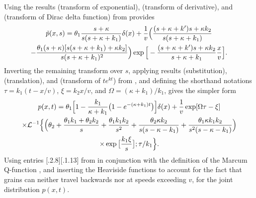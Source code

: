 Using the results \DIFaddbegin [\DIFaddend 15.103\DIFaddbegin ] \DIFaddend (transform of exponential), \DIFaddbegin [\DIFaddend 15.123\DIFaddbegin ] \DIFaddend (transform of derivative), and \DIFaddbegin [\DIFaddend 15.141\DIFaddbegin ] \DIFaddend (transform of Dirac delta function) from \citet{Arfken1985} provides 
\begin{multline} \tilde{p}(x,s) = \theta_1 \frac{s+\kappa}{s(s+\kappa + k_1)}\delta(x) + \frac{1}{v} \Big(\frac{(s+\kappa+k')s+\kappa k_2}{s(s+\kappa+k_1)} \\- \frac{\theta_1(s+\kappa)[s(s+\kappa+k_1)+\kappa k_2]}{s(s+\kappa+k_1)^2}\Big)
	\exp\Big[-\frac{(s+\kappa+k')s+\kappa k_2}{s+\kappa+k_1}\frac{x}{v}\Big].\end{multline}
Inverting the remaining transform over $s$, applying results \DIFaddbegin [\DIFaddend 15.152\DIFaddbegin ] \DIFaddend (substitution), \DIFaddbegin [\DIFaddend 15.164\DIFaddbegin ] \DIFaddend (translation), and \DIFaddbegin [\DIFaddend 15.175\DIFaddbegin ] \DIFaddend (transform of $te^{kt}$) from \citet{Arfken1985}, and defining the shorthand notations $\tau = k_1(t-x/v)$, $\xi = k_2 x/v$, and $\Omega = (\kappa + k_1)/k_1$, gives the simpler form 
\begin{multline}
	p(x,t) = \theta_1\Big[1-\frac{k_1}{\kappa + k_1}\big(1-e^{-(\kappa + k_1)t}\big)\Big]\delta(x) + \frac{1}{v}\exp[\Omega \tau - \xi]\\
	\times \mathcal{L}^{-1}\Big\{\Big( \theta_2 + \frac{\theta_1k_1+\theta_2 k_2}{s}+\frac{\theta_1k_1k_2}{s^2} + \frac{\theta_2\kappa k_2}{s(s-\kappa-k_1)} + \frac{\theta_1\kappa k_1 k_2}{s^2(s-\kappa-k_1)}\Big)\\
	\times\exp\big[\frac{k_1 \xi}{s}\big];\tau/k_1\Big\}.
\end{multline}
Using entries \DIFadd{, }[.2.8\DIFdelbegin {}\DIFdelend \DIFaddbegin ][.1.13\DIFaddbegin ] \DIFaddend from \citet{Prudnikov1992a} in conjunction with the definition of the \DIFaddbegin {}\DIFaddend Marcum Q-function \DIFdelbegin {}\DIFdelend \DIFaddbegin {}\DIFaddend , and inserting the Heaviside functions to account for the fact that grains can neither travel backwards nor at speeds exceeding $v$, \DIFdelbegin {}\DIFdelend \DIFaddbegin {}\DIFaddend for the joint distribution $p(x,t)$.

